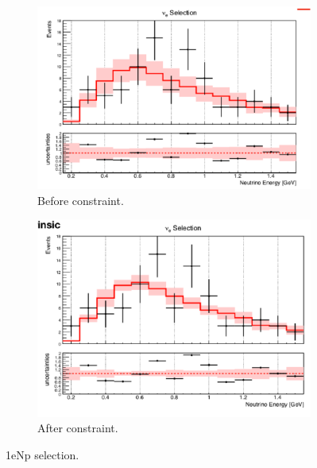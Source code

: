 \begin{figure}[H] 
\begin{center}
    \begin{subfigure}[b]{0.45\textwidth}
    \centering
    \includegraphics[width=1.00\textwidth]{Fakedata/set3/np_before_constrain.pdf}
    \caption{\label{fig:fakedata:set3:np_before_constrain} Before constraint.}
    \end{subfigure}
    \begin{subfigure}[b]{0.45\textwidth}
    \centering
    \includegraphics[width=1.00\textwidth]{Fakedata/set3/np_after_constrain.pdf}
    \caption{\label{fig:fakedata:set3:np_after_constrain} After constraint.}
    \end{subfigure}
\caption{\label{fig:fakedata:set3:np_const} 1eNp selection.}
\end{center}
\end{figure}

